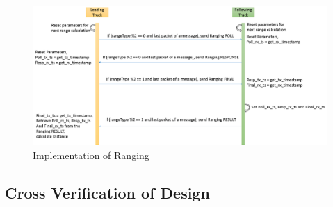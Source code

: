\begin{figure}[h!]
    \includegraphics[width=1\textwidth]{figures/RangingCalculation}
    \centering
    \caption{Implementation of Ranging}
    \label{fig:implementationOfRanging}    
\end{figure}

\vspace{2cm}

\subsection{Cross Verification of Design}

